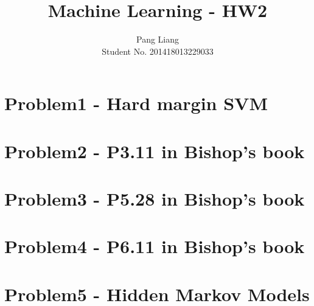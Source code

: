 \documentclass[12pt]{article}
\title{Machine Learning - HW2}
\author{Pang Liang\\ Student No. 201418013229033}
\begin{document}
\maketitle



\section{Problem1 - Hard margin SVM}


\section{Problem2 - P3.11 in Bishop's book}


\section{Problem3 - P5.28 in Bishop's book}


\section{Problem4 - P6.11 in Bishop's book}


\section{Problem5 - Hidden Markov Models}
\end{document}
